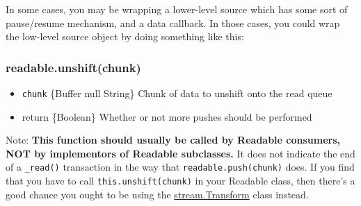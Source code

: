 In some cases, you may be wrapping a lower-level source which has some
sort of pause/resume mechanism, and a data callback. In those cases, you
could wrap the low-level source object by doing something like this:

\begin{Shaded}
\begin{Highlighting}[]

  

 \NormalTok{= }
   \NormalTok{(!}
    \NormalTok{();}
\NormalTok{\};}

 \NormalTok{= }\NormalTok{() \{}
\NormalTok{\};}

 \NormalTok{= }
  \NormalTok{();}
\NormalTok{\};}
\end{Highlighting}
\end{Shaded}

\subsubsection{readable.unshift(chunk)}

\begin{itemize}
\item
  \texttt{chunk} \{Buffer \textbar{} null \textbar{} String\} Chunk of
  data to unshift onto the read queue
\item
  return \{Boolean\} Whether or not more pushes should be performed
\end{itemize}

Note: \textbf{This function should usually be called by Readable
consumers, NOT by implementors of Readable subclasses.} It does not
indicate the end of a \texttt{\_read()} transaction in the way that
\texttt{readable.push(chunk)} does. If you find that you have to call
\texttt{this.unshift(chunk)} in your Readable class, then there's a good
chance you ought to be using the
\hyperref[stream_class_stream_transform]{stream.Transform} class
instead.

